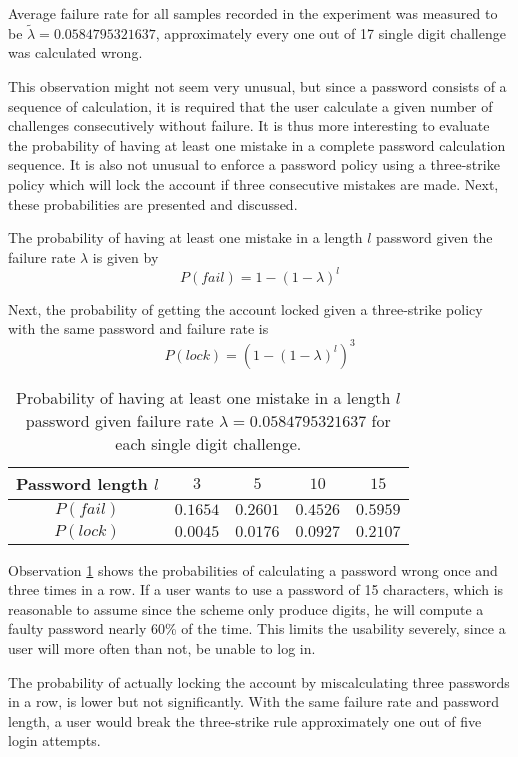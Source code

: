 \begin{observation}\label{obs:failrate}
    Average failure rate for all samples recorded in the experiment was measured to be $\tilde \lambda = 0.0584795321637$, approximately every one out of 17 single digit challenge was calculated wrong.
\end{observation}
This observation might not seem very unusual, but since a password consists of a sequence of calculation, it is required that the user calculate a given number of challenges consecutively without failure. It is thus more interesting to evaluate the probability of having at least one mistake in a complete password calculation sequence. It is also not unusual to enforce a password policy using a three-strike policy which will lock the account if three consecutive mistakes are made. Next, these probabilities are presented and discussed. 


The probability of having at least one mistake in a length $l$ password given the failure rate $\lambda$ is given by
\begin{equation}\label{eq:failrate}
    P(fail) = 1 - (1 - \lambda)^l
\end{equation}

Next, the probability of getting the account locked given a three-strike policy with the same password and failure rate is 
\begin{equation}\label{eq:lockrate}
    P(lock) = ( 1 - (1 - \lambda)^l )^3
\end{equation}


\begin{table}[h]
    \centering
\begin{tabular}{|c|c|c|c|c|}
    \hline
    Password length $l$ & $3$ & $5$ & $10$ & $15$ \\ \hline \hline
    $P(fail)$ & $0.1654$ & $0.2601$ & $0.4526$ & $0.5959$ \\ \hline
    $P(lock)$ & $0.0045$ & $0.0176$ & $0.0927$ & $0.2107$ \\ \hline
\end{tabular}
\caption{Probability of having at least one mistake in a length $l$ password given failure rate $\lambda = 0.0584795321637$ for each single digit challenge.}
\label{tbl:failrate}
\end{table}
 
\par Observation \ref{tbl:failrate} shows the probabilities of calculating a password wrong once and three times in a row. If a user wants to use a password of 15 characters, which is reasonable to assume since the scheme only produce digits, he will compute a faulty password nearly 60\% of the time. This limits the usability severely, since a user will more often than not, be unable to log in.
\par The probability of actually locking the account by miscalculating three passwords in a row, is lower but not significantly. With the same failure rate and password length, a user would break the three-strike rule approximately one out of five login attempts.

